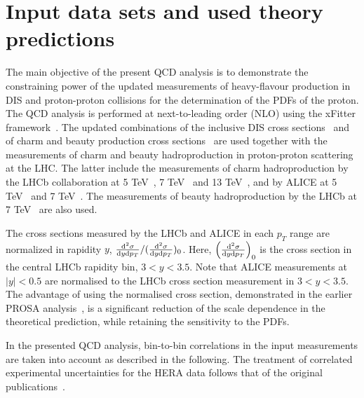 \documentclass[12pt]{article}
\begin{document}
\section{Input data sets and used theory predictions}
\label{sec:qcdanalysis}

The main objective of the present QCD analysis is to demonstrate the constraining power of the updated measurements of 
heavy-flavour production in DIS and proton-proton collisions for the determination of the PDFs of the proton. 
The QCD analysis is performed at next-to-leading order (NLO) using the xFitter framework~\cite{Alekhin:2014irh}. 
The updated combinations of the inclusive DIS cross sections~\cite{Abramowicz:2015mha} and of charm and beauty production cross sections~\cite{H1:2018flt} are used together with the measurements of charm and beauty hadroproduction in proton-proton scattering at the LHC. The latter include the measurements of charm hadroproduction by the LHCb collaboration at 5 TeV~\cite{Aaij:2016jht}, 7 TeV~\cite{Aaij:2013mga} and 13 TeV~\cite{Aaij:2015bpa}, and by ALICE at 5 TeV~\cite{Acharya:2019mgn} and 7 TeV~\cite{Acharya:2017jgo}. The measurements of beauty hadroproduction by the LHCb at 7 TeV~\cite{Aaij:2013noa} are also used.

The cross sections measured by the LHCb and ALICE in each $p_T$ range are normalized in rapidity $y$, $\frac{{\rm d}^2\sigma}{{\rm d}y{\rm d}p_T} / (\frac{{\rm d}^2\sigma}{{\rm d}y{\rm d}p_T})_{0}$. Here, $\left(\frac{{\rm d}^2\sigma}{{\rm d}y{\rm d}p_T}\right)_{0}$ is the cross section in the central LHCb rapidity bin, $3 < y < 3.5$. 
Note that ALICE measurements at $|y| < 0.5$ are normalised to the LHCb cross section measurement in $3 < y < 3.5$. 
The advantage of using the normalised cross section, demonstrated in the earlier PROSA analysis~\cite{Zenaiev:2015rfa}, 
is a significant reduction of the scale dependence in the theoretical prediction,  while retaining the sensitivity to 
the PDFs. 

In the presented QCD analysis, bin-to-bin correlations in the input measurements are taken into account as described in the following. The treatment of correlated experimental uncertainties for the HERA data follows that of the original publications~\cite{Abramowicz:2015mha,H1:2018flt}.
 
\end{document}
